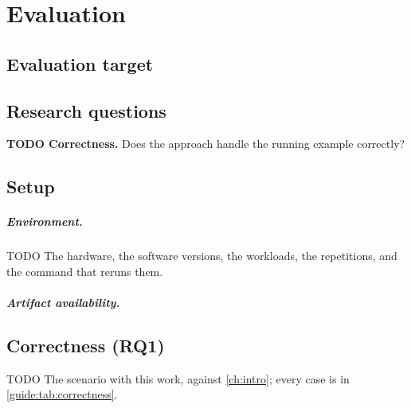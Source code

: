 \chapter{Evaluation}\label{ch:evaluation}

\section{Evaluation target}\label{sec:eval-target}

\section{Research questions}
\begin{rqlist}
  \item\label{guide:rq:correct} \textbf{TODO Correctness.} Does the approach handle the running example correctly?
\end{rqlist}

\section{Setup}\label{sec:setup}

\paragraph{Environment.}
TODO The hardware, the software versions, the workloads, the repetitions, and the command that reruns them.

\paragraph{Artifact availability.}

\section{Correctness (RQ1)}
\begin{runningexample}[solved]
TODO The scenario with this work, against \cref{ch:intro}; every case is in \cref{guide:tab:correctness}.
\end{runningexample}


